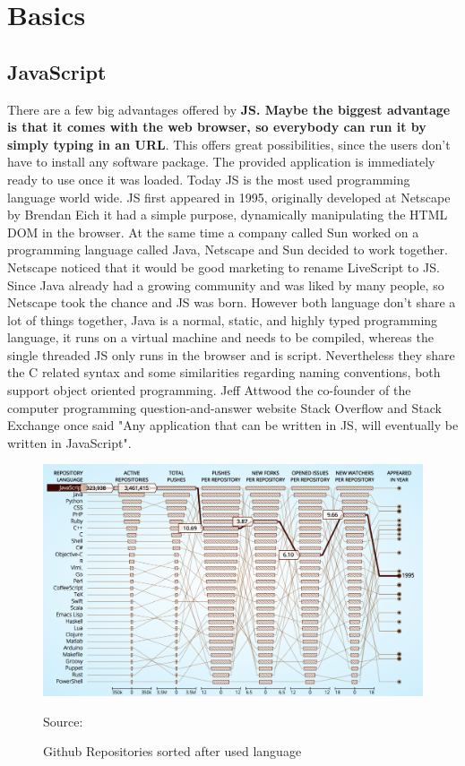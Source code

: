 \chapter{Basics}

\section{JavaScript}
There are a few big advantages offered by \textbf{\gls{JS}. Maybe the biggest advantage is that it comes with the web browser, so everybody can run it by simply typing in an \gls{URL}}. This offers great possibilities, since the users don't have to install any software package. The provided application is immediately ready to use once it was loaded. Today \gls{JS} is the most used programming language world wide. 
\gls{JS} first appeared in 1995, originally developed at Netscape by Brendan Eich it had a simple purpose, dynamically manipulating the HTML DOM in the browser. At the same time a company called Sun worked on a programming language called Java, Netscape and Sun decided to work together. Netscape noticed that it would be good marketing to rename LiveScript to \gls{JS}. Since Java already had a growing community and was liked by many people, so Netscape took the chance and \gls{JS} was born. However both language don't share a lot of things together, Java is a normal, static, and highly typed programming language, it runs on a virtual machine and needs to be compiled, whereas the single threaded \gls{JS} only runs in the browser and is script. Nevertheless they share the C related syntax and some similarities regarding naming conventions, both support object oriented programming. Jeff Attwood the co-founder of the  computer programming question-and-answer website Stack Overflow and Stack Exchange once said "Any application that can be written in \gls{JS}, will eventually be written in JavaScript".

\begin{figure}[hb]
	\centering
	\includegraphics[scale=0.5]{bilder/grundlagen/jsUsage.png}
	\caption{Github Repositories sorted after used language} Source:\cite{JSUSAGE}
	\label{fig:JSUSAGE}
\end{figure}


